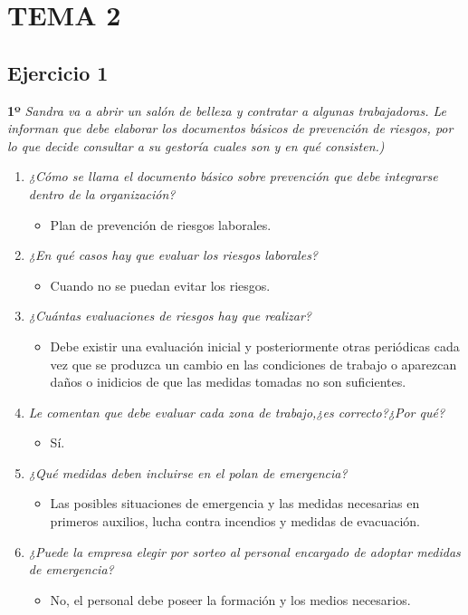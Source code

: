 \documentclass{article}
\begin{document}
    \section{TEMA 2}
      \subsection{Ejercicio 1}
        \textbf{1º} \textit{Sandra va a abrir un salón de belleza y contratar a algunas trabajadoras. Le informan que debe elaborar los documentos básicos de prevención de riesgos, por lo que decide consultar a su 
        gestoría cuales son y en qué consisten.)}
        \\
        \begin{enumerate}[label=(\alph*)]
          \item \textit{¿Cómo se llama el documento básico sobre prevención que debe integrarse dentro de la organización?}
            \begin{itemize}
              \item Plan de prevención de riesgos laborales.
            \end{itemize}
          \item \textit{¿En qué casos hay que evaluar los riesgos laborales?}
            \begin{itemize}
              \item Cuando no se puedan evitar los riesgos.
            \end{itemize}
          \item \textit{¿Cuántas evaluaciones de riesgos hay que realizar?}
            \begin{itemize}
              \item Debe existir una evaluación inicial y posteriormente otras periódicas cada vez que se produzca un cambio en las condiciones de trabajo o aparezcan daños o inidicios de que las medidas tomadas no son suficientes.
            \end{itemize}
          \item \textit{Le comentan que debe evaluar cada zona de trabajo,¿es correcto?¿Por qué?}
            \begin{itemize}
              \item Sí.
            \end{itemize}
          \item \textit{¿Qué medidas deben incluirse en el polan de emergencia?}
            \begin{itemize}
              \item Las posibles situaciones de emergencia y las medidas necesarias en primeros auxilios, lucha contra incendios y medidas de evacuación.
            \end{itemize}
          \item \textit{¿Puede la empresa elegir por sorteo al personal encargado de adoptar medidas de emergencia?}
            \begin{itemize}
              \item No, el personal debe poseer la formación y los medios necesarios.
            \end{itemize}
        \end{enumerate}
    \newpage
\end{document}
